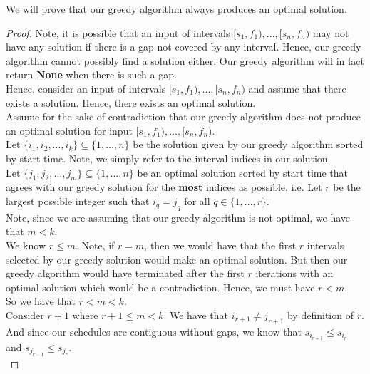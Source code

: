 \documentclass[12pt]{article}
\begin{document}
We will prove that our greedy algorithm always produces an optimal solution. 

\begin{proof}

Note, it is possible that an input of intervals $[s_1, f_1),...,[s_n,f_n)$ may not have any solution if there is a gap not covered by any interval. Hence, our greedy algorithm cannot possibly find a solution either. Our greedy algorithm will in fact return \textbf{None} when there is such a gap. \\

Hence, consider an input of intervals $[s_1, f_1),...,[s_n,f_n)$ and assume that there exists a solution. Hence, there exists an optimal solution. \\

Assume for the sake of contradiction that our greedy algorithm does not produce an optimal solution for input $[s_1, f_1),...,[s_n,f_n)$. \\

Let $\{i_1,i_2,...,i_k\} \subseteq \{1,...,n\}$ be the solution given by our greedy algorithm sorted by start time. Note, we simply refer to the interval indices in our solution. \\

Let $\{j_1,j_2,...,j_m\} \subseteq \{1,...,n\}$ be an optimal solution sorted by start time that agrees with our greedy solution for the \textbf{most} indices as possible. i.e. Let $r$ be the largest possible integer such that $i_q = j_q$ for all $q \in \{1,...,r\}$. \\

Note, since we are assuming that our greedy algorithm is not optimal, we have that $m < k$. \\

We know $r \leq m$. Note, if $r = m$, then we would have that the first $r$ intervals selected by our greedy solution would make an optimal solution. But then our greedy algorithm would have terminated after the first $r$ iterations with an optimal solution which would be a contradiction. Hence, we must have $r < m$. \\

So we have that $r < m < k$. \\

Consider $r + 1$ where $r + 1 \leq m < k$. We have that $i_{r+1} \neq j_{r+1}$ by definition of $r$. \\

And since our schedules are contiguous without gaps, we know that $s_{i_{r+1}} \leq s_{i_r}$ and $s_{j_{r+1}} \leq s_{j_r}$. \\


\end{proof}
\end{document}
